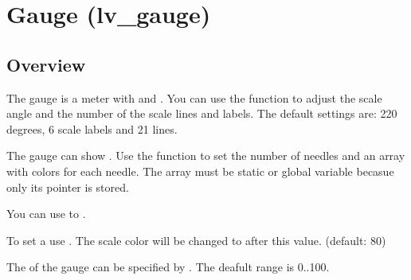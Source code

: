 \documentclass[letterpaper,10pt,english]{sphinxmanual}
\begin{document}
\section{Gauge (lv\_gauge)}
\label{\detokenize{object-types/gauge:gauge-lv-gauge}}\label{\detokenize{object-types/gauge::doc}}

\subsection{Overview}
\label{\detokenize{object-types/gauge:overview}}
The gauge is a meter with  and .
You can use the  function to adjust the scale angle and the number of the scale lines and labels.
The default settings are:  220 degrees, 6 scale labels and 21 lines.

The gauge can show .
Use the  function to set the number of needles and an array with colors for each needle. The array must be static or global variable becasue only its pointer is stored.

You can use  to .

To set a  use . The scale color will be changed to  after this value. (default: 80)

The  of the gauge can be specified by . The deafult range is 0..100.
\end{document}
